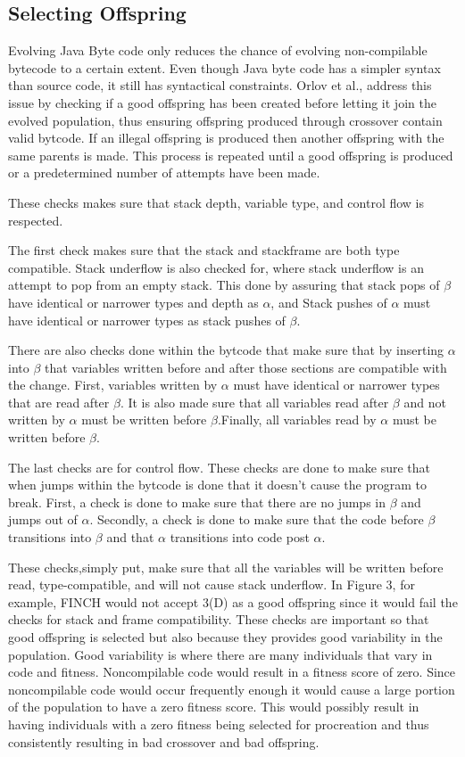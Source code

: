 \documentclass{sig-alternate}
\begin{document}
\subsection{Selecting Offspring}
Evolving Java Byte code only reduces the chance of evolving non-compilable bytecode to a certain extent. Even though Java byte code has a simpler syntax than source code, it still has syntactical constraints. Orlov et al.,\cite{FINCH2:2009} address this issue by checking if a good offspring has been created before letting it join the evolved population, thus ensuring offspring produced through crossover contain valid bytcode. If an illegal offspring is produced then another offspring with the same parents is made. This process is repeated until a good offspring is produced or a predetermined number of attempts have been made.\par
These checks makes sure that stack depth, variable type, and control flow is respected.

The first check makes sure that the stack and stackframe are both type compatible. Stack underflow is also checked for, where stack underflow is an attempt to pop from an empty stack. This done by assuring that stack pops of $\beta$ have identical or narrower types and depth as $\alpha$, and Stack pushes of $\alpha$ must have identical or narrower types as stack pushes of $\beta$.

There are also checks done within the bytcode that make sure that by inserting $\alpha$ into $\beta$ that variables written before and after those sections are compatible with the change. 
First, variables written by $\alpha$ must have identical or narrower types that are read after $\beta$. It is also made sure that all variables read after $\beta$ and not written by $\alpha$ must be written before $\beta$.Finally, all variables read by $\alpha$ must be written before $\beta$.

The last checks are for control flow. These checks are done to make sure that when jumps within the bytcode is done that it doesn't cause the program to break. First, a check is done to make sure that there are no jumps in $\beta$ and jumps out of $\alpha$. Secondly, a check is done to make sure that the code before $\beta$ transitions into $\beta$ and that $\alpha$ transitions into code post $\alpha$.\par


These checks,simply put, make sure that all the variables will be written before read, type-compatible, and will not cause stack underflow\cite{FINCH2:2009}. In Figure 3, for example, FINCH would not accept 3(D) as a good offspring since it would fail the checks for stack and frame compatibility.
These checks are important so that good offspring is selected but also because they provides good variability in the population. Good variability is where there are many individuals that vary in code and fitness. Noncompilable code would result in a fitness score of zero. Since noncompilable code would occur frequently enough it would cause a large portion of the population to have a zero fitness score. This would possibly result in having individuals with a zero fitness being selected for procreation and thus consistently resulting in bad crossover and bad offspring.
\end{document}
